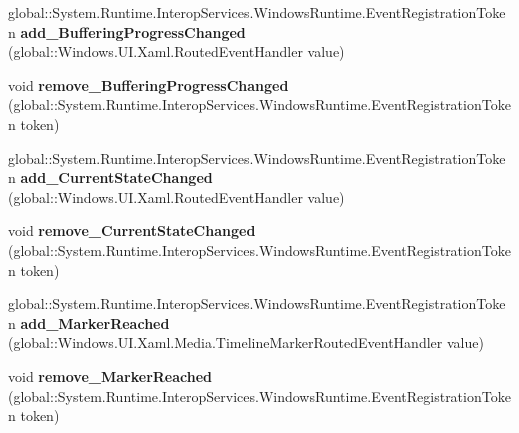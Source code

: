 \begin{DoxyCompactItemize}
global\+::\+System.\+Runtime.\+Interop\+Services.\+Windows\+Runtime.\+Event\+Registration\+Token {\bfseries add\+\_\+\+Buffering\+Progress\+Changed} (global\+::\+Windows.\+U\+I.\+Xaml.\+Routed\+Event\+Handler value)
\item 
\mbox{\label{interface_windows_1_1_u_i_1_1_xaml_1_1_controls_1_1_i_media_element_a080932b18d45c0da51366f4fe31041cf}} 
void {\bfseries remove\+\_\+\+Buffering\+Progress\+Changed} (global\+::\+System.\+Runtime.\+Interop\+Services.\+Windows\+Runtime.\+Event\+Registration\+Token token)
\item 
\mbox{\label{interface_windows_1_1_u_i_1_1_xaml_1_1_controls_1_1_i_media_element_a357521c35f1e1c53f78bf72c62939f5f}} 
global\+::\+System.\+Runtime.\+Interop\+Services.\+Windows\+Runtime.\+Event\+Registration\+Token {\bfseries add\+\_\+\+Current\+State\+Changed} (global\+::\+Windows.\+U\+I.\+Xaml.\+Routed\+Event\+Handler value)
\item 
\mbox{\label{interface_windows_1_1_u_i_1_1_xaml_1_1_controls_1_1_i_media_element_ae3f1850941fbf004a45cd333886cd5ff}} 
void {\bfseries remove\+\_\+\+Current\+State\+Changed} (global\+::\+System.\+Runtime.\+Interop\+Services.\+Windows\+Runtime.\+Event\+Registration\+Token token)
\item 
\mbox{\label{interface_windows_1_1_u_i_1_1_xaml_1_1_controls_1_1_i_media_element_abe1f11754f86e35e5a3b093554c58043}} 
global\+::\+System.\+Runtime.\+Interop\+Services.\+Windows\+Runtime.\+Event\+Registration\+Token {\bfseries add\+\_\+\+Marker\+Reached} (global\+::\+Windows.\+U\+I.\+Xaml.\+Media.\+Timeline\+Marker\+Routed\+Event\+Handler value)
\item 
\mbox{\label{interface_windows_1_1_u_i_1_1_xaml_1_1_controls_1_1_i_media_element_a0238b7aba4ea8d50a18b11bbccde3c0c}} 
void {\bfseries remove\+\_\+\+Marker\+Reached} (global\+::\+System.\+Runtime.\+Interop\+Services.\+Windows\+Runtime.\+Event\+Registration\+Token token)
\item 
\mbox{\label{interface_windows_1_1_u_i_1_1_xaml_1_1_controls_1_1_i_media_element_afdb9ef8dc66f874e5bd722e80ec927bb}} 

\end{DoxyCompactItemize}
